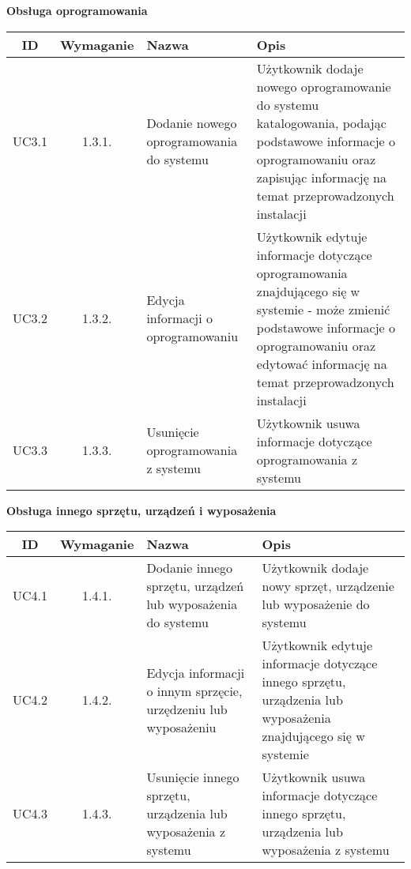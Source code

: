 \begin{table}[!ht]
	\begin{center}
		{\Large\bf Obsługa oprogramowania} \\
	\end{center}
\begin{tabular}{| c | c | p{} | p{} |}
	\hline \textbf{ID} & \textbf{Wymaganie} & \textbf{Nazwa} & \textbf{Opis} \\
	\hline UC3.1 & 1.3.1. & Dodanie nowego oprogramowania do systemu & Użytkownik dodaje nowego oprogramowanie do systemu katalogowania, podając podstawowe informacje o oprogramowaniu oraz zapisując informację na temat przeprowadzonych instalacji \\
	\hline UC3.2 & 1.3.2. & Edycja informacji o oprogramowaniu & Użytkownik edytuje informacje dotyczące oprogramowania znajdującego się w systemie - może zmienić podstawowe informacje o oprogramowaniu oraz edytować informację na temat przeprowadzonych instalacji \\
	\hline UC3.3 & 1.3.3. & Usunięcie oprogramowania z systemu & Użytkownik usuwa informacje dotyczące oprogramowania z systemu  \\
	\hline
\end{tabular}
\end{table}

\begin{table}[!ht]
	\begin{center}
		{\Large\bf Obsługa innego sprzętu, urządzeń i wyposażenia} \\
	\end{center}
\begin{tabular}{| c | c | p{} | p{} |}
	\hline \textbf{ID} & \textbf{Wymaganie} & \textbf{Nazwa} & \textbf{Opis} \\
	\hline UC4.1 & 1.4.1. & Dodanie innego sprzętu, urządzeń lub wyposażenia do systemu & Użytkownik dodaje nowy sprzęt, urządzenie lub wyposażenie do systemu \\
	\hline UC4.2 & 1.4.2. & Edycja informacji o innym sprzęcie, urzędzeniu lub wyposażeniu & Użytkownik edytuje informacje dotyczące innego sprzętu, urządzenia lub wyposażenia znajdującego się w systemie \\
	\hline UC4.3 & 1.4.3. & Usunięcie innego sprzętu, urządzenia lub wyposażenia z systemu & Użytkownik usuwa informacje dotyczące innego sprzętu, urządzenia lub wyposażenia z systemu \\
	\hline
\end{tabular}
\end{table}

